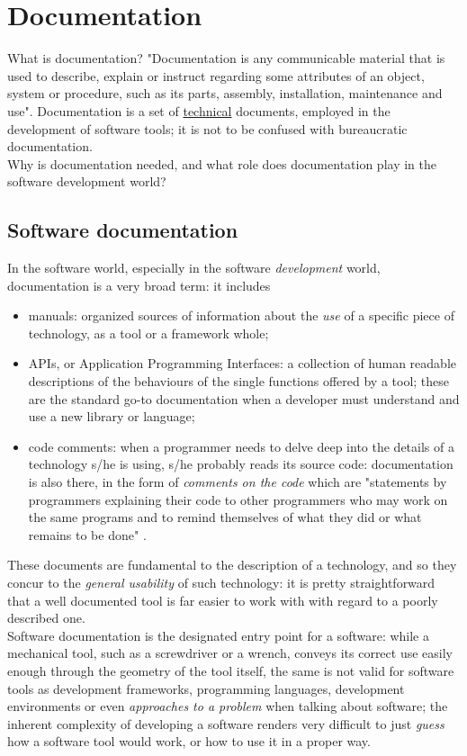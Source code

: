 \documentclass{article}
\begin{document}
	\tableofcontents
	\clearpage

	\section{Documentation}
		What is documentation? "Documentation is any communicable material that is used to describe, explain or instruct regarding some attributes of an object, system or procedure, such as its parts, assembly, installation, maintenance and use"\cite{linuxdoc}. Documentation is a set of \underline{technical} documents, employed in the development of software tools; it is not to be confused with bureaucratic documentation.\\
		Why is documentation needed, and what role does documentation play in the software development world?
		
		\subsection{Software documentation}
			In the software world, especially in the software \textit{development} world, documentation is a very broad term: it includes 
			\begin{itemize}
				\item manuals: organized sources of information about the \textit{use} of a specific piece of technology, as a tool or a framework whole;
				\item APIs, or Application Programming Interfaces: a collection of human readable descriptions of the behaviours of the single functions offered by a tool; these are the standard go-to documentation when a developer must understand and use a new library or language;
				\item code comments: when a programmer needs to delve deep into the details of a technology s/he is using, s/he probably reads its source code: documentation is also there, in the form of \textit{comments on the code} which are "statements by programmers explaining their code to other programmers who may work on the same programs and to remind themselves of what they did or what remains to be done" \cite{linuxdoc}.
			\end{itemize}
			These documents are fundamental to the description of a technology, and so they concur to the \textit{general usability} of such technology: it is pretty straightforward that a well documented tool is far easier to work with with regard to a poorly described one.\\
			Software documentation is the designated entry point for a software: while a mechanical tool, such as a screwdriver or a wrench, conveys its correct use easily enough through the geometry of the tool itself, the same is not valid for software tools as development frameworks, programming languages, development environments or even \textit{approaches to a problem} when talking about software; the inherent complexity of developing a software renders very difficult to just \textit{guess} how a software tool would work, or how to use it in a proper way.
\end{document}
